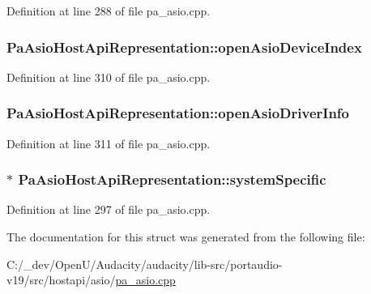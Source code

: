 Definition at line 288 of file pa\+\_\+asio.\+cpp.

\subsubsection[{\texorpdfstring{open\+Asio\+Device\+Index}{openAsioDeviceIndex}}]{ Pa\+Asio\+Host\+Api\+Representation\+::open\+Asio\+Device\+Index}\hypertarget{struct_pa_asio_host_api_representation_a7c0a166188935ebcfb04a328082db441}{}\label{struct_pa_asio_host_api_representation_a7c0a166188935ebcfb04a328082db441}


Definition at line 310 of file pa\+\_\+asio.\+cpp.

\subsubsection[{\texorpdfstring{open\+Asio\+Driver\+Info}{openAsioDriverInfo}}]{ Pa\+Asio\+Host\+Api\+Representation\+::open\+Asio\+Driver\+Info}\hypertarget{struct_pa_asio_host_api_representation_a8e40fc856a3e71915b1d5c3dbe901b52}{}\label{struct_pa_asio_host_api_representation_a8e40fc856a3e71915b1d5c3dbe901b52}


Definition at line 311 of file pa\+\_\+asio.\+cpp.

\subsubsection[{\texorpdfstring{system\+Specific}{systemSpecific}}]{$\ast$ Pa\+Asio\+Host\+Api\+Representation\+::system\+Specific}\hypertarget{struct_pa_asio_host_api_representation_aff14b5ae683f1490006752d81e3d3981}{}\label{struct_pa_asio_host_api_representation_aff14b5ae683f1490006752d81e3d3981}


Definition at line 297 of file pa\+\_\+asio.\+cpp.



The documentation for this struct was generated from the following file\+:\begin{DoxyCompactItemize}
\item 
C\+:/\+\_\+dev/\+Open\+U/\+Audacity/audacity/lib-\/src/portaudio-\/v19/src/hostapi/asio/\hyperlink{pa__asio_8cpp}{pa\+\_\+asio.\+cpp}\end{DoxyCompactItemize}
